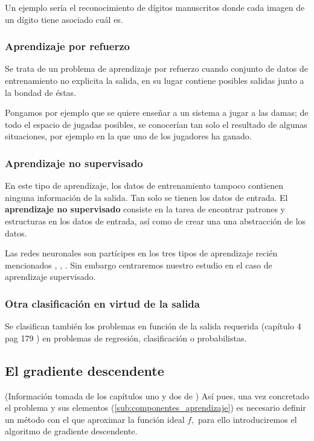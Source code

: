 Un ejemplo sería el reconocimiento de dígitos  manuscritos donde cada imagen de un dígito tiene asociado cuál es. 


\subsubsection{Aprendizaje por refuerzo}  
Se trata de un problema de aprendizaje por refuerzo 
cuando conjunto de datos de entrenamiento no explicita la salida, en su lugar contiene posibles salidas junto a la bondad de éstas. 

Pongamos por ejemplo que se quiere enseñar a un sistema a jugar
a las damas; de todo el espacio de jugadas posibles, se conocerían tan solo el resultado de algunas situaciones, por ejemplo en la que uno de los jugadores ha ganado.  

\subsubsection{Aprendizaje no supervisado}  

En este tipo de aprendizaje, los datos de entrenamiento tampoco contienen ninguna información de la salida.
 Tan solo se tienen los datos de entrada. El \textbf{aprendizaje no supervisado} 
 consiste en la tarea de encontrar patrones y estructuras en los datos de entrada, 
 así como de crear una una abstracción de los datos.  


Las redes neuronales son partícipes en los tres tipos de aprendizaje 
recién mencionados
\cite{8612259}, \cite{DBLP:journals/corr/BakerGNR16}, \cite{10.5555/2955491.2955578}. Sin embargo centraremos nuestro estudio en el caso 
de aprendizaje supervisado. 

\subsubsection*{Otra clasificación en virtud de la salida}

Se clasifican también los problemas en función de la salida requerida (capítulo 4 pag 179
\cite{BishopPaterRecognition}) en problemas de regresión, clasificación o probabilistas. 

\subsection{El gradiente descendente} \label{sec:gradiente-descendente}

(Información tomada de los capítulos uno y dos de \cite{learning-from-data-1-2})
Así pues, una vez concretado el problema y sus elementos 
(\ref{sub:componentes_aprendizaje}) es necesario definir un método con el que aproximar la función ideal $f,$ para ello introduciremos el algoritmo de gradiente descendente.  

